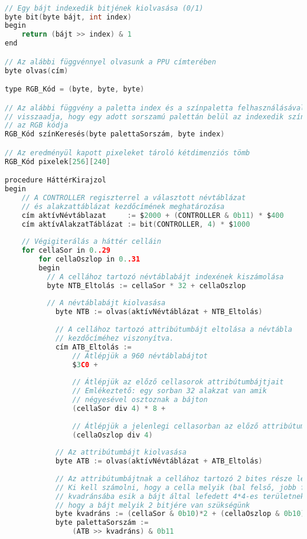 \begin{lstlisting}[backgroundcolor = \color{white}, language=c]

// Egy bájt indexedik bitjének kiolvasása (0/1)
byte bit(byte bájt, int index)
begin
	return (bájt >> index) & 1
end

// Az alábbi függvénnyel olvasunk a PPU címterében
byte olvas(cím)

type RGB_Kód = (byte, byte, byte)

// Az alábbi függvény a paletta index és a színpaletta felhasználásával 
// visszaadja, hogy egy adott sorszamú palettán belül az indexedik színnek mi
// az RGB kódja
RGB_Kód színKeresés(byte palettaSorszám, byte index)

// Az eredményül kapott pixeleket tároló kétdimenziós tömb
RGB_Kód pixelek[256][240]

procedure HáttérKirajzol
begin
	// A CONTROLLER regiszterrel a választott névtáblázat
	// és alakzattáblázat kezdőcímének meghatározása
	cím aktívNévtáblazat     := $2000 + (CONTROLLER & 0b11) * $400
	cím aktívAlakzatTáblázat := bit(CONTROLLER, 4) * $1000
	
	// Végigiterálás a háttér celláin
	for cellaSor in 0..29
		for cellaOszlop in 0..31
		begin
		  // A cellához tartozó névtáblabájt indexének kiszámolása
		  byte NTB_Eltolás := cellaSor * 32 + cellaOszlop 
		  
		  // A névtáblabájt kiolvasása
			byte NTB := olvas(aktívNévtáblázat + NTB_Eltolás)
			
			// A cellához tartozó attribútumbájt eltolása a névtábla
			// kezdőcíméhez viszonyítva.
			cím ATB_Eltolás := 
				// Átlépjük a 960 névtáblabájtot 
				$3C0 +		
								
				// Átlépjük az előző cellasorok attribútumbájtjait
				// Emlékeztető: egy sorban 32 alakzat van amik 
				// négyesével osztoznak a bájton
				(cellaSor div 4) * 8 + 	
					
				// Átlépjük a jelenlegi cellasorban az előző attribútumbájtokat
				(cellaOszlop div 4)         
				
			// Az attribútumbájt kiolvasása
			byte ATB := olvas(aktívNévtáblázat + ATB_Eltolás)
			
			// Az attribútumbájtnak a cellához tartozó 2 bites része lesz a palettasorszám.
			// Ki kell számolni, hogy a cella melyik (bal felső, jobb felső, stb.)
			// kvadránsába esik a bájt által lefedett 4*4-es területnek, ugyanis így kapjuk meg,
			// hogy a bájt melyik 2 bitjére van szükségünk
			byte kvadráns := (cellaSor & 0b10)*2 + (cellaOszlop & 0b10) 
			byte palettaSorszám :=
				(ATB >> kvadráns) & 0b11
				

\end{lstlisting}
